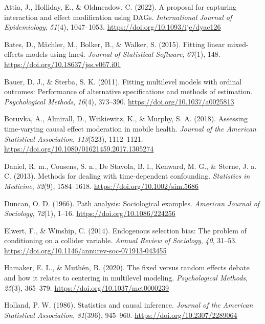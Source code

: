 \documentclass[
  11pt,
  a4paper,
]{article}
\newlength{\cslhangindent}
\newenvironment{CSLReferences}[2] %
 {\begin{list}{}{%
  \setlength{\itemindent}{0pt}
  \setlength{\leftmargin}{0pt}
  \setlength{\parsep}{0pt}
  \ifodd #1
   \setlength{\leftmargin}{\cslhangindent}
   \setlength{\itemindent}{-1\cslhangindent}
  \fi
  \setlength{\itemsep}{#2\baselineskip}}}
 {\end{list}}
\begin{document}
\label{refs}
\begin{CSLReferences}{1}{0}
Attia, J., Holliday, E., \& Oldmeadow, C. (2022). A proposal for
capturing interaction and effect modification using DAGs.
\emph{International Journal of Epidemiology}, \emph{51}(4), 1047--1053.
\url{https://doi.org/10.1093/ije/dyac126}

Bates, D., Mächler, M., Bolker, B., \& Walker, S. (2015). Fitting linear
mixed-effects models using {lme4}. \emph{Journal of Statistical
Software}, \emph{67}(1), 148.
\url{https://doi.org/10.18637/jss.v067.i01}

Bauer, D. J., \& Sterba, S. K. (2011). Fitting multilevel models with
ordinal outcomes: Performance of alternative specifications and methods
of estimation. \emph{Psychological Methods}, \emph{16}(4), 373--390.
\url{https://doi.org/10.1037/a0025813}

Boruvka, A., Almirall, D., Witkiewitz, K., \& Murphy, S. A. (2018).
Assessing time-varying causal effect moderation in mobile health.
\emph{Journal of the American Statistical Association}, \emph{113}(523),
1112--1121. \url{https://doi.org/10.1080/01621459.2017.1305274}

Daniel, R. m., Cousens, S. n., De Stavola, B. l., Kenward, M. G., \&
Sterne, J. a. C. (2013). Methods for dealing with time-dependent
confounding. \emph{Statistics in Medicine}, \emph{32}(9), 1584--1618.
\url{https://doi.org/10.1002/sim.5686}

Duncan, O. D. (1966). Path analysis: Sociological examples.
\emph{American Journal of Sociology}, \emph{72}(1), 1--16.
\url{https://doi.org/10.1086/224256}

Elwert, F., \& Winship, C. (2014). Endogenous selection bias: The
problem of conditioning on a collider variable. \emph{Annual Review of
Sociology}, \emph{40}, 31--53.
\url{https://doi.org/10.1146/annurev-soc-071913-043455}

Hamaker, E. L., \& Muthén, B. (2020). The fixed versus random effects
debate and how it relates to centering in multilevel modeling.
\emph{Psychological Methods}, \emph{25}(3), 365--379.
\url{https://doi.org/10.1037/met0000239}

Holland, P. W. (1986). Statistics and causal inference. \emph{Journal of
the American Statistical Association}, \emph{81}(396), 945--960.
\url{https://doi.org/10.2307/2289064}


\end{CSLReferences}
\end{document}
